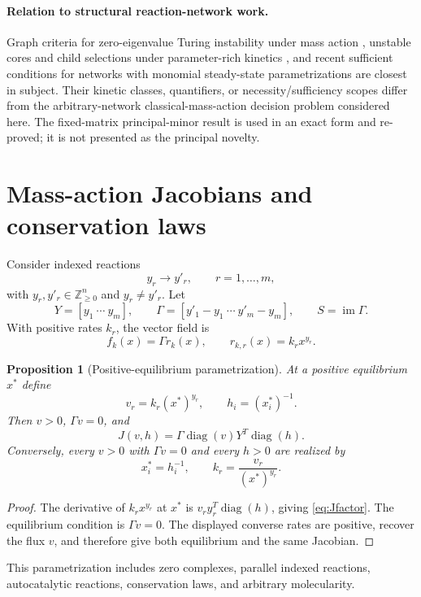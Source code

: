 \documentclass[11pt]{article}
\newtheorem{proposition}[theorem]{Proposition}
\theoremstyle{definition}
\newcommand{\diag}{\operatorname{diag}}
\newcommand{\im}{\operatorname{im}}
\begin{document}
\paragraph{Relation to structural reaction-network work.}
Graph criteria for zero-eigenvalue Turing instability under mass action
\cite{MinchevaCraciun2013}, unstable cores and child selections under
parameter-rich kinetics \cite{VassenaStadler2024,Vassena2025}, and recent
sufficient conditions for networks with monomial steady-state
parametrizations \cite{Conradi2026} are closest in subject.  Their kinetic
classes, quantifiers, or necessity/sufficiency scopes differ from the
arbitrary-network classical-mass-action decision problem considered here.
The fixed-matrix principal-minor result is used in an exact form and re-proved;
it is not presented as the principal novelty.

\section{Mass-action Jacobians and conservation laws}
\label{sec:setup}

Consider indexed reactions
\[
 y_r\longrightarrow y'_r,\qquad r=1,\ldots,m,
\]
with $y_r,y'_r\in\mathbb Z_{\geq0}^n$ and $y_r\ne y'_r$.  Let
\[
 Y=[y_1\ \cdots\ y_m],\qquad
 \Gamma=[y'_1-y_1\ \cdots\ y'_m-y_m],\qquad
 S=\im\Gamma.
\]
With positive rates $k_r$, the vector field is
\[
 f_k(x)=\Gamma r_k(x),\qquad r_{k,r}(x)=k_rx^{y_r}.
\]

\begin{proposition}[Positive-equilibrium parametrization]
\label{prop:param}
At a positive equilibrium $x^*$ define
\[
 v_r=k_r(x^*)^{y_r},\qquad h_i=(x_i^*)^{-1}.
\]
Then $v>0$, $\Gamma v=0$, and
\begin{equation}
 J(v,h)=\Gamma\diag(v)Y^T\diag(h).
 \label{eq:Jfactor}
\end{equation}
Conversely, every $v>0$ with $\Gamma v=0$ and every $h>0$ are realized by
\[
 x_i^*=h_i^{-1},\qquad k_r=\frac{v_r}{(x^*)^{y_r}}.
\]
\end{proposition}

\begin{proof}
The derivative of $k_rx^{y_r}$ at $x^*$ is
$v_ry_r^T\diag(h)$, giving \eqref{eq:Jfactor}.  The equilibrium condition is
$\Gamma v=0$.  The displayed converse rates are positive, recover the flux
$v$, and therefore give both equilibrium and the same Jacobian.
\end{proof}

This parametrization includes zero complexes, parallel indexed reactions,
autocatalytic reactions, conservation laws, and arbitrary molecularity.
\end{document}
